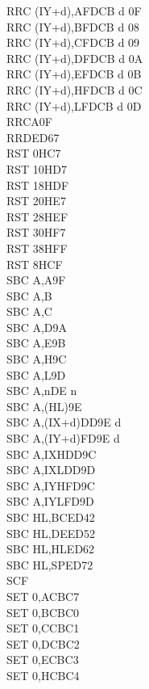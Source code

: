\documentclass[12pt,twoside,openright,a4paper]{book}
\begin{document}
\begin{multicols}{3}
{\begin{tabbing}
		RRC (IY+d),A\UNDOC\>FDCB d 0F\\
		RRC (IY+d),B\UNDOC\>FDCB d 08\\
		RRC (IY+d),C\UNDOC\>FDCB d 09\\
		RRC (IY+d),D\UNDOC\>FDCB d 0A\\
		RRC (IY+d),E\UNDOC\>FDCB d 0B\\
		RRC (IY+d),H\UNDOC\>FDCB d 0C\\
		RRC (IY+d),L\UNDOC\>FDCB d 0D\\
		RRCA\>0F\\
		RRD\>ED67\\
		RST 0H\>C7\\
		RST 10H\>D7\\
		RST 18H\>DF\\
		RST 20H\>E7\\
		RST 28H\>EF\\
		RST 30H\>F7\\
		RST 38H\>FF\\
		RST 8H\>CF\\
		SBC A,A\>9F\\
		SBC A,B\\
		SBC A,C\\
		SBC A,D\>9A\\
		SBC A,E\>9B\\
		SBC A,H\>9C\\
		SBC A,L\>9D\\
		SBC A,n\>DE n\\
		SBC A,(HL)\>9E\\
		SBC A,(IX+d)\>DD9E d\\
		SBC A,(IY+d)\>FD9E d\\
		SBC A,IXH\UNDOC\>DD9C\\
		SBC A,IXL\UNDOC\>DD9D\\
		SBC A,IYH\UNDOC\>FD9C\\
		SBC A,IYL\UNDOC\>FD9D\\
		SBC HL,BC\>ED42\\
		SBC HL,DE\>ED52\\
		SBC HL,HL\>ED62\\
		SBC HL,SP\>ED72\\
		SCF\\
		SET 0,A\>CBC7\\
		SET 0,B\>CBC0\\
		SET 0,C\>CBC1\\
		SET 0,D\>CBC2\\
		SET 0,E\>CBC3\\
		SET 0,H\>CBC4\\

\end{tabbing}}
\end{multicols}
\end{document}
